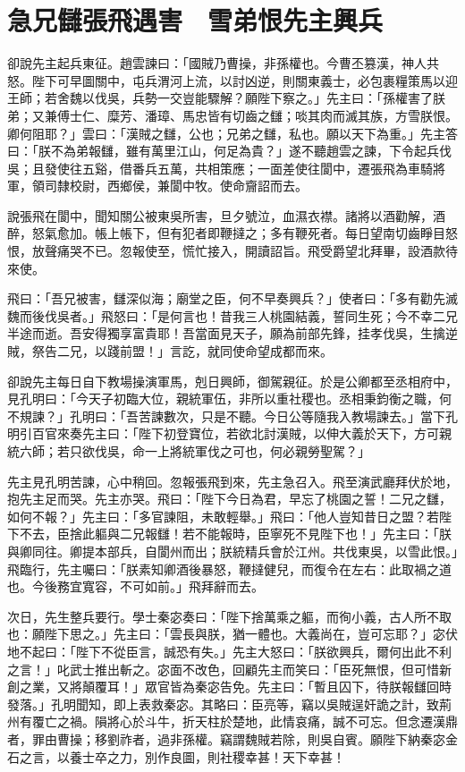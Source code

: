 
\chapter{急兄讎張飛遇害　雪弟恨先主興兵}

卻說先主起兵東征。趙雲諫曰：「國賊乃曹操，非孫權也。今曹丕篡漢，神人共怒。陛下可早圖關中，屯兵渭河上流，以討凶逆，則關東義士，必包裹糧策馬以迎王師；若舍魏以伐吳，兵勢一交豈能驟解？願陛下察之。」先主曰：「孫權害了朕弟；又兼傅士仁、糜芳、潘璋、馬忠皆有切齒之讎；啖其肉而滅其族，方雪朕恨。卿何阻耶？」雲曰：「漢賊之讎，公也；兄弟之讎，私也。願以天下為重。」先主答曰：「朕不為弟報讎，雖有萬里江山，何足為貴？」遂不聽趙雲之諫，下令起兵伐吳；且發使往五谿，借番兵五萬，共相策應；一面差使往閬中，遷張飛為車騎將軍，領司隸校尉，西鄉侯，兼閬中牧。使命齎詔而去。

說張飛在閬中，聞知關公被東吳所害，旦夕號泣，血濕衣襟。諸將以酒勸解，酒醉，怒氣愈加。帳上帳下，但有犯者即鞭撻之；多有鞭死者。每日望南切齒睜目怒恨，放聲痛哭不已。忽報使至，慌忙接入，開讀詔旨。飛受爵望北拜畢，設酒款待來使。

飛曰：「吾兄被害，讎深似海；廟堂之臣，何不早奏興兵？」使者曰：「多有勸先滅魏而後伐吳者。」飛怒曰：「是何言也！昔我三人桃園結義，誓同生死；今不幸二兄半途而逝。吾安得獨享富貴耶！吾當面見天子，願為前部先鋒，挂孝伐吳，生擒逆賊，祭告二兄，以踐前盟！」言訖，就同使命望成都而來。

卻說先主每日自下教場操演軍馬，剋日興師，御駕親征。於是公卿都至丞相府中，見孔明曰：「今天子初臨大位，親統軍伍，非所以重社稷也。丞相秉鈞衡之職，何不規諫？」孔明曰：「吾苦諫數次，只是不聽。今日公等隨我入教場諫去。」當下孔明引百官來奏先主曰：「陛下初登寶位，若欲北討漢賊，以伸大義於天下，方可親統六師；若只欲伐吳，命一上將統軍伐之可也，何必親勞聖駕？」

先主見孔明苦諫，心中稍回。忽報張飛到來，先主急召入。飛至演武廳拜伏於地，抱先主足而哭。先主亦哭。飛曰：「陛下今日為君，早忘了桃園之誓！二兄之讎，如何不報？」先主曰：「多官諫阻，未敢輕舉。」飛曰：「他人豈知昔日之盟？若陛下不去，臣捨此軀與二兄報讎！若不能報時，臣寧死不見陛下也！」先主曰：「朕與卿同往。卿提本部兵，自閬州而出；朕統精兵會於江州。共伐東吳，以雪此恨。」飛臨行，先主囑曰：「朕素知卿酒後暴怒，鞭撻健兒，而復令在左右：此取禍之道也。今後務宜寬容，不可如前。」飛拜辭而去。

次日，先生整兵要行。學士秦宓奏曰：「陛下捨萬乘之軀，而徇小義，古人所不取也：願陛下思之。」先主曰：「雲長與朕，猶一體也。大義尚在，豈可忘耶？」宓伏地不起曰：「陛下不從臣言，誠恐有失。」先主大怒曰：「朕欲興兵，爾何出此不利之言！」叱武士推出斬之。宓面不改色，回顧先主而笑曰：「臣死無恨，但可惜新創之業，又將顛覆耳！」眾官皆為秦宓告免。先主曰：「暫且囚下，待朕報讎回時發落。」孔明聞知，即上表救秦宓。其略曰：臣亮等，竊以吳賊逞奸詭之計，致荊州有覆亡之禍。隕將心於斗牛，折天柱於楚地，此情哀痛，誠不可忘。但念遷漢鼎者，罪由曹操；移劉祚者，過非孫權。竊謂魏賊若除，則吳自賓。願陛下納秦宓金石之言，以養士卒之力，別作良圖，則社稷幸甚！天下幸甚！

